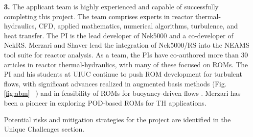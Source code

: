 \noindent \textbf{3.}
The applicant team is highly experienced and capable of successfully completing
this project.  The team comprises experts in reactor thermal-hydraulics, CFD,
applied mathematics, numerical algorithms, turbulence, and heat transfer.  The
PI is the lead developer of Nek5000 and a co-developer of NekRS.  Merzari and
Shaver lead the integration of Nek5000/RS into the NEAMS tool suite for reactor
analysis.  As a team, the PIs have co-authored more than 30 articles in reactor
thermal-hydraulics, with many of these focused on ROMs.  The PI and his
students at UIUC continue to push ROM development for turbulent flows, with
significant advances realized in augmented basis methods (Fig. \ref{fig:abm}
$\,$ \cite{kaneko22a}) and in feasibility of ROMs for buoyancy-driven flows
\cite{kaneko20a,tsai22a}.  Merzari has been a pioneer in exploring POD-based
ROMs for TH applications.  

Potential risks and mitigation strategies for the project are identified in the
Unique Challenges section.


